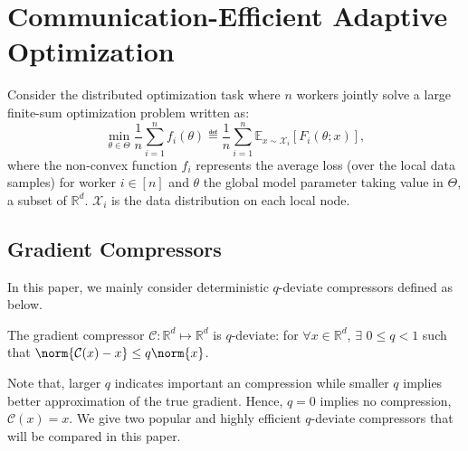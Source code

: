 \documentclass[11pt]{article}
\begin{document}
\section{Communication-Efficient Adaptive Optimization}\label{sec:main}


Consider the distributed optimization task where $n$ workers jointly solve a large finite-sum optimization problem written as:
\begin{equation}\label{eq:opt}
\min \limits_{\theta \in \Theta} \frac{1}{n} \sum_{i=1}^n f_i(\theta)\eqdef \frac{1}{n} \sum_{i=1}^n \mathbb E_{x\sim \mathcal X_i}[F_i(\theta;x)],
\end{equation}
where the non-convex function $f_i$ represents the average loss (over the local data samples) for worker $i \in [n]$ and $\theta$ the global model parameter taking value in $\Theta$, a subset of $\mathbb{R}^d$. $\mathcal X_i$ is the data distribution on each local node.



%
%


\subsection{Gradient Compressors}

In this paper, we mainly consider deterministic $q$-deviate compressors defined as below.

\begin{assumption}\label{ass:quant} The gradient compressor $\mathcal C:\mathbb R^d\mapsto \mathbb R^d$ is $q$-deviate: for $\forall x\in\mathbb R^d$, $\exists$ $0\leq q < 1$ such that $\norm{\mathcal C(x)-x} \leq q \norm{x}$.
\end{assumption}
Note that, larger $q$ indicates important an compression while smaller $q$ implies better approximation of the true gradient. 
Hence, $q=0$ implies no compression, \ie~$\mathcal C(x)=x$. 
We give two popular and highly efficient $q$-deviate compressors that will be compared in this paper.
\end{document}
